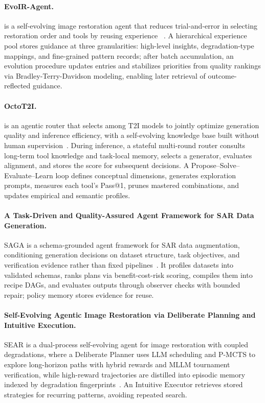 \paragraph{EvoIR-Agent.}
 is a self-evolving image restoration agent that reduces trial-and-error in selecting restoration order and tools by reusing experience ~\cite{avg260522208}. A hierarchical experience pool stores guidance at three granularities: high-level insights, degradation-type mappings, and fine-grained pattern records; after batch accumulation, an evolution procedure updates entries and stabilizes priorities from quality rankings via Bradley-Terry-Davidson modeling, enabling later retrieval of outcome-reflected guidance. 

\paragraph{OctoT2I.}
 is an agentic router that selects among T2I models to jointly optimize generation quality and inference efficiency, with a self-evolving knowledge base built without human supervision~\cite{jiang2026octot2i}. During inference, a stateful multi-round router consults long-term tool knowledge and task-local memory, selects a generator, evaluates alignment, and stores the score for subsequent decisions. A Propose–Solve–Evaluate–Learn loop defines conceptual dimensions, generates exploration prompts, measures each tool's Pass@1, prunes mastered combinations, and updates empirical and semantic profiles.

\paragraph{A Task-Driven and Quality-Assured Agent Framework for SAR Data Generation.}
SAGA is a schema-grounded agent framework for SAR data augmentation, conditioning generation decisions on dataset structure, task objectives, and verification evidence rather than fixed pipelines~\cite{avg260628896}. It profiles datasets into validated schemas, ranks plans via benefit-cost-risk scoring, compiles them into recipe DAGs, and evaluates outputs through observer checks with bounded repair; policy memory stores evidence for reuse.

\paragraph{Self-Evolving Agentic Image Restoration via Deliberate Planning and Intuitive Execution.}
SEAR is a dual-process self-evolving agent for image restoration with coupled degradations, where a Deliberate Planner uses LLM scheduling and P-MCTS to explore long-horizon paths with hybrid rewards and MLLM tournament verification, while high-reward trajectories are distilled into episodic memory indexed by degradation fingerprints~\cite{avg260628971}. An Intuitive Executor retrieves stored strategies for recurring patterns, avoiding repeated search. 

